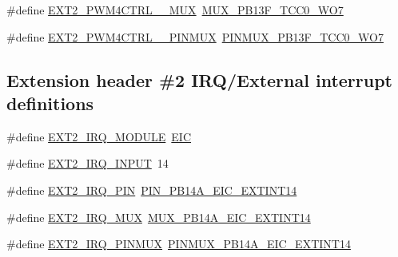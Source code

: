 \begin{DoxyCompactItemize}
\item 
\#define \mbox{\hyperlink{group__samd21__xplained__pro__features__group_gaa1a8145c970c027496e0ac5acc069c39}{E\+X\+T2\+\_\+\+P\+W\+M4\+C\+T\+R\+L\+\_\+\_\+\+M\+UX}}~\mbox{\hyperlink{pio_2samd21j18a_8h_a8efef8d38fd10d8f14e9394b0561c67c}{M\+U\+X\+\_\+\+P\+B13\+F\+\_\+\+T\+C\+C0\+\_\+\+W\+O7}}
\item 
\#define \mbox{\hyperlink{group__samd21__xplained__pro__features__group_gaead22ff2ab9100a11f5265ffa1cacfe2}{E\+X\+T2\+\_\+\+P\+W\+M4\+C\+T\+R\+L\+\_\+\_\+\+P\+I\+N\+M\+UX}}~\mbox{\hyperlink{pio_2samd21j18a_8h_ad35539fcb76623253dfaf3f9247e4351}{P\+I\+N\+M\+U\+X\+\_\+\+P\+B13\+F\+\_\+\+T\+C\+C0\+\_\+\+W\+O7}}
\end{DoxyCompactItemize}
\subsection*{Extension header \#2 I\+R\+Q/\+External interrupt definitions}
\begin{DoxyCompactItemize}
\item 
\#define \mbox{\hyperlink{group__samd21__xplained__pro__features__group_ga9c7d09aeb7bba32ec8bca4f14d66a70c}{E\+X\+T2\+\_\+\+I\+R\+Q\+\_\+\+M\+O\+D\+U\+LE}}~\mbox{\hyperlink{group___s_a_m_d21_j18_a__base_ga27183a94584b5fca7e1207ce7a79782a}{E\+IC}}
\item 
\#define \mbox{\hyperlink{group__samd21__xplained__pro__features__group_gabab814617e9251dc70998b42ed7cdb4f}{E\+X\+T2\+\_\+\+I\+R\+Q\+\_\+\+I\+N\+P\+UT}}~14
\item 
\#define \mbox{\hyperlink{group__samd21__xplained__pro__features__group_ga463f0f401aa67ecec8d09529eca77a68}{E\+X\+T2\+\_\+\+I\+R\+Q\+\_\+\+P\+IN}}~\mbox{\hyperlink{pio_2samd21j18a_8h_a97b02a75f517744286a792170b1b7007}{P\+I\+N\+\_\+\+P\+B14\+A\+\_\+\+E\+I\+C\+\_\+\+E\+X\+T\+I\+N\+T14}}
\item 
\#define \mbox{\hyperlink{group__samd21__xplained__pro__features__group_ga4bb40e6d553d9016fbd69f3ccc79ebc0}{E\+X\+T2\+\_\+\+I\+R\+Q\+\_\+\+M\+UX}}~\mbox{\hyperlink{pio_2samd21j18a_8h_ad29925a7b34bd6bcf03b3cace21ea476}{M\+U\+X\+\_\+\+P\+B14\+A\+\_\+\+E\+I\+C\+\_\+\+E\+X\+T\+I\+N\+T14}}
\item 
\#define \mbox{\hyperlink{group__samd21__xplained__pro__features__group_ga30035ae80991aa23f39da81428529ac4}{E\+X\+T2\+\_\+\+I\+R\+Q\+\_\+\+P\+I\+N\+M\+UX}}~\mbox{\hyperlink{pio_2samd21j18a_8h_ac3753b411b7b24386dfc7b997a6c743f}{P\+I\+N\+M\+U\+X\+\_\+\+P\+B14\+A\+\_\+\+E\+I\+C\+\_\+\+E\+X\+T\+I\+N\+T14}}
\end{DoxyCompactItemize}
